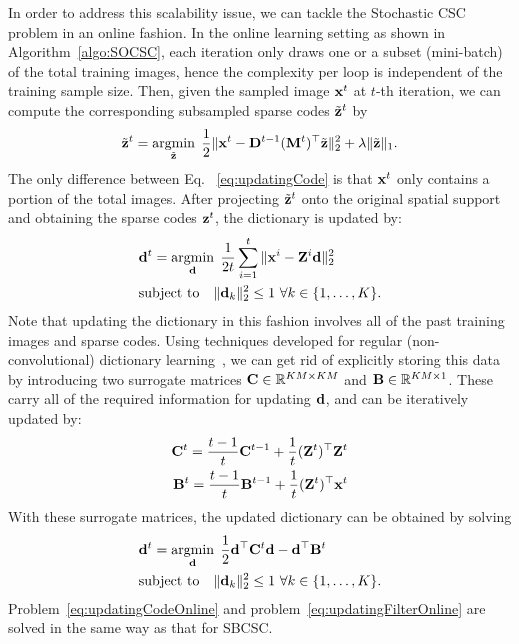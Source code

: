 In order to address this scalability issue, we can tackle the
Stochastic CSC problem in an online fashion. In the online learning
setting as shown in Algorithm~\ref{algo:SOCSC}, each iteration only
draws one or a subset (mini-batch) of the total training images, hence
the complexity per loop is independent of the training sample
size. Then, given the sampled image $\signal^t$ at $t$-th iteration,
we can compute the corresponding subsampled sparse codes $\subcode^t$ by
\begin{equation} \label{eq:updatingCodeOnline}
    \subcode^t = \minimize{\subcode} \frac{1}{2}\|\signal^t - \Filter^{t-1} (\mask^t)^\top \subcode \|_2^2 + \lambda \|\subcode\|_1.
\end{equation}
The only difference between Eq. ~\ref{eq:updatingCode} is that $\signal^t$ only contains a portion of the total images. After projecting $\subcode^t$ onto the original spatial support and obtaining the sparse codes $\code^t$, the dictionary is updated by:
\begin{equation}
\begin{split}
    &\filter^t = \minimize{\filter} \frac{1}{2t}\sum_{i=1}^{t} \|\signal^i - \Code^i \filter \|_2^2 \\
    &\text{subject to} \quad \|\filter_k\|^2_2 \leq 1 ~ \forall k \in \{1,\dots,K\}.
\end{split}
\end{equation}
Note that updating the dictionary in this fashion involves all of the
past training images and sparse codes. Using techniques developed for
regular (non-convolutional) dictionary
learning~\cite{mairal2009online,mairal2010online}, we can get rid of
explicitly storing this data by introducing two surrogate matrices
$\surC \in \mathbb{R}^{KM \times KM}$ and $\surB \in \mathbb{R}^{KM
  \times 1}$. These carry all of the required information for updating
$\filter$, and can be iteratively updated by:
\begin{equation} \label{eq:updateSur}
\begin{split}
    \surC^t  = \frac{t-1}{t} \surC^{t-1} + \frac{1}{t}(\Code^t)^\top \Code^t \\
    \surB^t  = \frac{t-1}{t} \surB^{t-1} + \frac{1}{t}(\Code^t)^\top \signal^t
\end{split}
\end{equation}
With these surrogate matrices, the updated dictionary can be obtained
by solving
\begin{equation} \label{eq:updatingFilterOnline}
\begin{split}
    & \filter^t = \minimize{\filter} \frac{1}{2} \filter^\top \surC^t\filter - \filter^\top \surB^t \\& \text{subject to} \quad \|\filter_k\|_2^2 \leq 1 ~ \forall k \in \{1,\dots,K\}.
\end{split}
\end{equation}
Problem~\eqref{eq:updatingCodeOnline} and
problem~\eqref{eq:updatingFilterOnline} are solved in the same way as
that for SBCSC.

